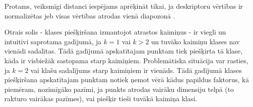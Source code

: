 \documentclass[12pt,paper=a4]{report}
\begin{document}
Protams, veiksmīgi distanci iespējams aprēķināt tikai, ja deskriptoru vērtības ir normalizētas jeb visas vērtības atrodas vienā diapozonā \cite{knn}.\par
Otrais solis - klases piešķiršana izmantojot atrastos kaimiņus - ir viegli un intuitīvi saprotama gadījumā, ja $k=1$ vai $k>2$ un tuvāko kaimiņu klases nav vienādi sadalītas. Tādā gadījumā apskatītajam punktam tiek piešķirta tā klase, kāda ir visbiežāk sastopama starp kaimiņiem. Problemātiska situācija var rasties, ja $k=2$ vai klašu sadalījums starp kaimiņiem ir vienāds. Tādā gadījumā klases piešķiršana apskatītajam punktam notiek ņemot vērā kādus papildus faktorus, kā piemēram, nozīmīgāko pazīmi, ja punkts atrodas vairāku dimensiju telpā (to rakturo vairākas pazīmes), vai piešķir tieši tuvākā kaimiņa klasi. \cite{knn} \par
\end{document}
